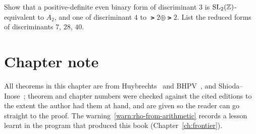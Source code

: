 \begin{exercise}
Show that a positive-definite even binary form of discriminant $3$ is
$\operatorname{SL}_2(\mathbb{Z})$-equivalent to $A_2$, and one of discriminant $4$ to
$\lat2\oplus\lat2$. List the reduced forms of discriminants $7$, $28$, $40$.
\end{exercise}

\section*{Chapter note}

All theorems in this chapter are from Huybrechts~\cite{Huybrechts2016} and
BHPV~\cite{BHPV2004}, and Shioda--Inose~\cite{ShiodaInose1977}; theorem and
chapter numbers were checked against the cited editions to the extent the
author had them at hand, and are given so the reader can go straight to the
proof. The warning~\ref{warn:rho-from-arithmetic} records a lesson learnt in
the program that produced this book (Chapter~\ref{ch:frontier}).
